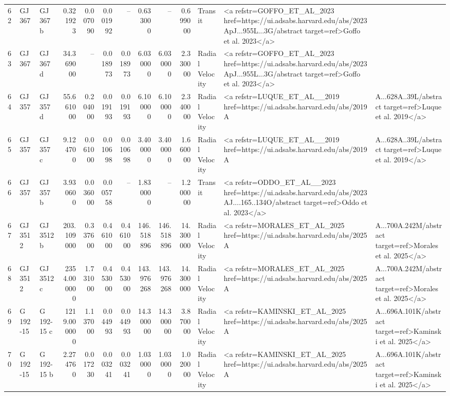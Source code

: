 \begin{tabular}{lllrrrrrrrll}
62 & GJ 367 & GJ 367 b & 0.321923 & 0.007090 & 0.001992 & -- & 0.633000 & -- & 0.699000 & Transit & <a refstr=GOFFO_ET_AL_2023 href=https://ui.adsabs.harvard.edu/abs/2023ApJ...955L...3G/abstract target=ref>Goffo et al. 2023</a> \\
63 & GJ 367 & GJ 367 d & 34.369000 & -- & 0.018973 & 0.018973 & 6.030000 & 6.030000 & 2.330000 & Radial Velocity & <a refstr=GOFFO_ET_AL_2023 href=https://ui.adsabs.harvard.edu/abs/2023ApJ...955L...3G/abstract target=ref>Goffo et al. 2023</a> \\
64 & GJ 357 & GJ 357 d & 55.661000 & 0.204000 & 0.019193 & 0.019193 & 6.100000 & 6.100000 & 2.340000 & Radial Velocity & <a refstr=LUQUE_ET_AL__2019 href=https://ui.adsabs.harvard.edu/abs/2019A&A...628A..39L/abstract target=ref>Luque et al. 2019</a> \\
65 & GJ 357 & GJ 357 c & 9.124700 & 0.061000 & 0.010698 & 0.010698 & 3.400000 & 3.400000 & 1.660000 & Radial Velocity & <a refstr=LUQUE_ET_AL__2019 href=https://ui.adsabs.harvard.edu/abs/2019A&A...628A..39L/abstract target=ref>Luque et al. 2019</a> \\
66 & GJ 357 & GJ 357 b & 3.930600 & 0.036000 & 0.005758 & -- & 1.830000 & -- & 1.200000 & Transit & <a refstr=ODDO_ET_AL__2023 href=https://ui.adsabs.harvard.edu/abs/2023AJ....165..134O/abstract target=ref>Oddo et al. 2023</a> \\
67 & GJ 3512 & GJ 3512 b & 203.109000 & 0.337600 & 0.461000 & 0.461000 & 146.518896 & 146.518896 & 14.300000 & Radial Velocity & <a refstr=MORALES_ET_AL_2025 href=https://ui.adsabs.harvard.edu/abs/2025A&A...700A.242M/abstract target=ref>Morales et al. 2025</a> \\
68 & GJ 3512 & GJ 3512 c & 2354.000000 & 1.731000 & 0.453000 & 0.453000 & 143.976268 & 143.976268 & 14.300000 & Radial Velocity & <a refstr=MORALES_ET_AL_2025 href=https://ui.adsabs.harvard.edu/abs/2025A&A...700A.242M/abstract target=ref>Morales et al. 2025</a> \\
69 & G 192-15 & G 192-15 c & 1219.000000 & 1.137000 & 0.044993 & 0.044993 & 14.300000 & 14.300000 & 3.870000 & Radial Velocity & <a refstr=KAMINSKI_ET_AL_2025 href=https://ui.adsabs.harvard.edu/abs/2025A&A...696A.101K/abstract target=ref>Kaminski et al. 2025</a> \\
70 & G 192-15 & G 192-15 b & 2.274760 & 0.017230 & 0.003241 & 0.003241 & 1.030000 & 1.030000 & 1.020000 & Radial Velocity & <a refstr=KAMINSKI_ET_AL_2025 href=https://ui.adsabs.harvard.edu/abs/2025A&A...696A.101K/abstract target=ref>Kaminski et al. 2025</a> \\

\end{tabular}
